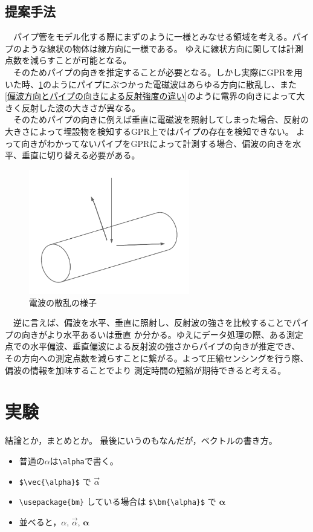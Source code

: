 \documentclass[a4paper,12pt]{jsreport}
\begin{document}
\section{提案手法}
　パイプ管をモデル化する際にまず\cite{imai}のように一様とみなせる領域を考える。パイプのような線状の物体は線方向に一様である。
ゆえに線状方向に関しては計測点数を減らすことが可能となる。
\\　そのためパイプの向きを推定することが必要となる。しかし実際にGPRを用いた時、\ref{電波の散乱の様子}のようにパイプにぶつかった電磁波はあらゆる方向に散乱し、また
\ref{偏波方向とパイプの向きによる反射強度の違い}のように電界の向きによって大きく反射した波の大きさが異なる。
\\　そのためパイプの向きに例えば垂直に電磁波を照射してしまった場合、反射の大きさによって埋設物を検知するGPR上ではパイプの存在を検知できない。
よって向きがわかってないパイプをGPRによって計測する場合、偏波の向きを水平、垂直に切り替える必要がある。

\begin{figure}[h]
  \begin{center}
   \includegraphics[width=7cm]{./image/scattering.pdf}
  \caption{電波の散乱の様子}\label{電波の散乱の様子}
  \end{center}
  \end{figure}

　逆に言えば、偏波を水平、垂直に照射し、反射波の強さを比較することでパイプの向きがより水平あるいは垂直
か分かる。ゆえにデータ処理の際、ある測定点での水平偏波、垂直偏波による反射波の強さからパイプの向きが推定でき、
その方向への測定点数を減らすことに繋がる。よって圧縮センシングを行う際、偏波の情報を加味することでより
測定時間の短縮が期待できると考える。

\chapter{実験}

結論とか，まとめとか。
最後にいうのもなんだが，ベクトルの書き方。
\begin{itemize}
\item 普通の$\alpha$は\verb|\alpha|で書く。
\item \verb|$\vec{\alpha}$| で $\vec{\alpha}$
\item \verb|\usepackage{bm}| している場合は
\verb|$\bm{\alpha}$| で $\bm{\alpha}$
\item 並べると，$\alpha$, $\vec{\alpha}$, $\bm{\alpha}$
\end{itemize}
\end{document}
